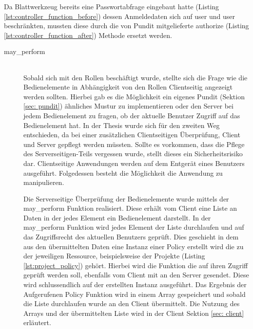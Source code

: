 

Da Blattwerkzeug bereits eine Passwortabfrage eingebaut hatte (Listing \ref{lst:controller_function_before}) dessen Anmeldedaten sich auf user und user beschränkten, mussten diese durch die von Pundit mitgelieferte authorize (Listing \ref{lst:controller_function_after}) Methode ersetzt werden.



\begin{minipage}{\linewidth}
	
\end{minipage}

\begin{description}
	\item[may\_perform]\hfill\\
	Sobald sich mit den Rollen beschäftigt wurde, stellte sich die Frage wie die Bedienelemente in Abhängigkeit von den Rollen Clientseitig angezeigt werden sollten. Hierbei gab es die Möglichkeit ein eigenes Pundit (Sektion \ref{sec: pundit}) ähnliches Mustur zu implementieren oder den Server bei jedem Bedienelement zu fragen, ob der aktuelle Benutzer Zugriff auf das Bedienelement hat. In der Thesis wurde sich für den zweiten Weg entschieden, da bei einer zusätzlichen Clientseitigen Überprüfung, Client und Server gepflegt werden müssten. Sollte es vorkommen, dass die Pflege des Serverseitigen-Teils vergessen wurde, stellt dieses ein Sicherheitsrisiko dar. Clientseitige Anwendungen werden auf dem Entgerät eines Benutzers ausgeführt. Folgedessen besteht die Möglichkeit die Anwendung zu manipulieren.

	Die Serverseitige Überprüfung der Bedienelemente wurde mittels der may\_perform Funktion realisiert. Diese erhält vom Client eine Liste an Daten in der jedes Element ein Bedienelement darstellt. In der may\_perform Funktion wird jedes Element der Liste durchlaufen und auf das Zugriffsrecht des aktuellen Benutzers geprüft. Dies geschieht in dem aus den übermittelten Daten eine Instanz einer Policy erstellt wird die zu der jeweiligen Ressource, beispielsweise der Projekte (Listing \ref{lst:project_policy}) gehört. Hierbei wird die Funktion die auf ihren Zugriff geprüft werden soll, ebenfalls vom Client mit an den Server gesendet. Diese wird schlussendlich auf der erstellten Instanz ausgeführt. Das Ergebnis der Aufgerufenen Policy Funktion wird in einem Array gespeichert und sobald die Liste durchlaufen wurde an den Client übermittelt. Die Nutzung des Arrays und der übermittelten Liste wird in der Client Sektion \ref{sec: client} erläutert.
\end{description}

